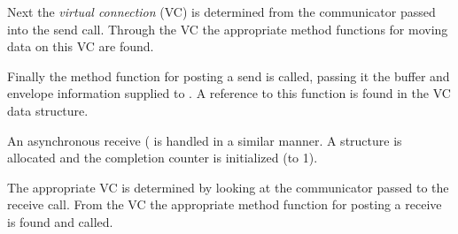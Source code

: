 \begin{comment}
  \emph{structure vs. object: the standard refers to \mpids{MPI_Request}
    objects and handles that refer to them.  should we use similar
    terminology.}
\end{comment}

\begin{comment}
  \emph{should we explain why the completion counter is set to a value of 1?}
  I think that should have been addressed in a previous section, so maybe we
  should just footnote it.
\end{comment}

\begin{comment}
  \emph{do we want to say something about the buffer in here?}  The buffer does
  not become an issue until we call the method's post function passing it the
  buffer.
\end{comment}

%
Next the \emph{virtual connection} (VC) is determined from the communicator
passed into the send call.  Through the VC the appropriate method functions
for moving data on this VC are found.

%
Finally the method function for posting a send is called, passing it the buffer
and envelope information supplied to .  A reference to this
function is found in the VC data structure.

\begin{comment}
  \emph{function pointer: didn't we agree that the function pointer table
  would be in the method object?  If so the above text needs to be fixed so
  that the VC is use to find the method and the method is used from that point
  forward.}
\end{comment}


An asynchronous receive ( is handled in a similar manner.  A
 structure is allocated and the completion counter is
initialized (to 1).
%

\begin{comment}
  \emph{buffer?}
\end{comment}

%
The appropriate VC is determined by looking at the communicator passed to the
receive call.  From the VC the appropriate method function for posting a
receive is found and called.
 
